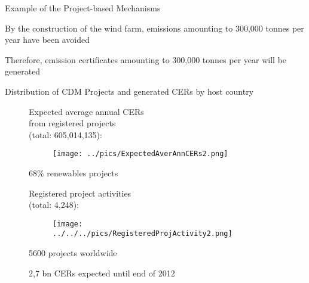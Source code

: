 
{Example of the Project-based Mechanisms}


	By the construction of the wind farm, emissions amounting to 300,000 tonnes per year have been avoided

	Therefore, emission certificates amounting to 300,000 tonnes per year will be generated



{Distribution of CDM Projects and generated CERs by host country }
\begin{figure}[t]
\begin{minipage}[t]{0.475\textwidth}
Expected average annual CERs \\
from registered projects \\
(total: 605,014,135):
\vspace*{-0.7cm}
\begin{figure}
\centering
\texttt{[image: ../pics/ExpectedAverAnnCERs2.png]}
\end{figure}
\vspace*{-0.8cm}


	68\% renewables projects %


\vspace*{-0.9cm}

\end{minipage}
\begin{minipage}[t]{0.475\textwidth}
Registered project activities\\
(total: 4,248):
\vspace*{-0.7cm}
\begin{figure}
\centering
\texttt{[image: ../../../pics/RegisteredProjActivity2.png]}
\end{figure}
\vspace*{-0.8cm}


	5600  projects worldwide

	2,7 bn CERs expected until end of 2012


\end{minipage}
\end{figure}

